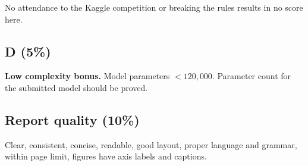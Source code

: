 \documentclass[11pt,a4paper]{article}
\begin{document}
No attendance to the Kaggle competition or breaking the rules results in no score here.

\subsection*{D (5\%)}
\textbf{Low complexity bonus.} Model parameters \(< 120{,}000\). Parameter count for the submitted model should be proved.

\subsection*{Report quality (10\%)}
Clear, consistent, concise, readable, good layout, proper language and grammar, within page limit, figures have axis labels and captions.
\end{document}
